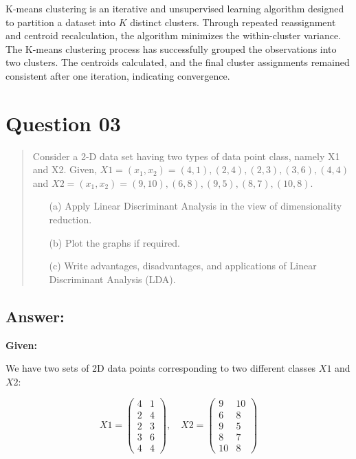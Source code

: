 \documentclass{exam}
\begin{document}
\newpage

K-means clustering is an iterative and unsupervised learning algorithm designed to partition a dataset into \( K \) distinct clusters. Through repeated reassignment and centroid recalculation, the algorithm minimizes the within-cluster variance. The K-means clustering process has successfully grouped the observations into two clusters. The centroids calculated, and the final cluster assignments remained consistent after one iteration, indicating convergence.


\section{Question 03}

\begin{quote}
Consider a 2-D data set having two types of data point class, namely X1 and X2. Given, \( X1 = (x_1, x_2) = (4, 1), (2, 4), (2, 3), (3, 6), (4, 4) \) and \( X2 = (x_1, x_2) = (9, 10), (6, 8), (9, 5), (8, 7), (10, 8) \).
\begin{itemize}
\item[(a)] Apply Linear Discriminant Analysis in the view of dimensionality reduction.
\item[(b)] Plot the graphs if required.
\item[(c)] Write advantages, disadvantages, and applications of Linear Discriminant Analysis (LDA).
\end{itemize}
\end{quote}

\subsection{Answer:}

\textbf{Given:}

We have two sets of 2D data points corresponding to two different classes \( X1 \) and \( X2 \):

\[
X1 = \begin{pmatrix} 4 & 1 \\ 2 & 4 \\ 2 & 3 \\ 3 & 6 \\ 4 & 4 \end{pmatrix}, \quad X2 = \begin{pmatrix} 9 & 10 \\ 6 & 8 \\ 9 & 5 \\ 8 & 7 \\ 10 & 8 \end{pmatrix}
\]
\end{document}
